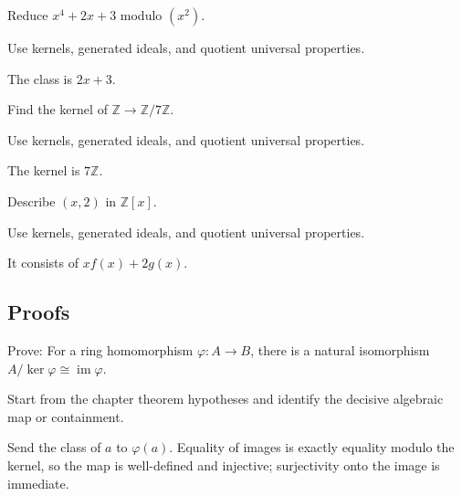 \begin{exercise}\label{exr:v01-expand-03}
Reduce $x^4+2x+3$ modulo $(x^2)$.
\end{exercise}
\begin{hint}
Use kernels, generated ideals, and quotient universal properties.
\end{hint}
\begin{solution}
The class is $2x+3$.
\end{solution}

\begin{exercise}[Kernel]\label{exr:v01-expand-04}
Find the kernel of $\mathbb Z\to\mathbb Z/7\mathbb Z$.
\end{exercise}
\begin{hint}
Use kernels, generated ideals, and quotient universal properties.
\end{hint}
\begin{solution}
The kernel is $7\mathbb Z$.
\end{solution}

\begin{exercise}\label{exr:v01-expand-05}
Describe $(x,2)$ in $\mathbb Z[x]$.
\end{exercise}
\begin{hint}
Use kernels, generated ideals, and quotient universal properties.
\end{hint}
\begin{solution}
It consists of $xf(x)+2g(x)$.
\end{solution}

\subsection*{Proofs}

\begin{exercise}\label{exr:v01-expand-06}
Prove: For a ring homomorphism $\varphi:A\to B$, there is a natural isomorphism $A/\ker\varphi\cong\operatorname{im}\varphi$.
\end{exercise}
\begin{hint}
Start from the chapter theorem hypotheses and identify the decisive algebraic map or containment.
\end{hint}
\begin{solution}
Send the class of $a$ to $\varphi(a)$. Equality of images is exactly equality modulo the kernel, so the map is well-defined and injective; surjectivity onto the image is immediate.
\end{solution}

